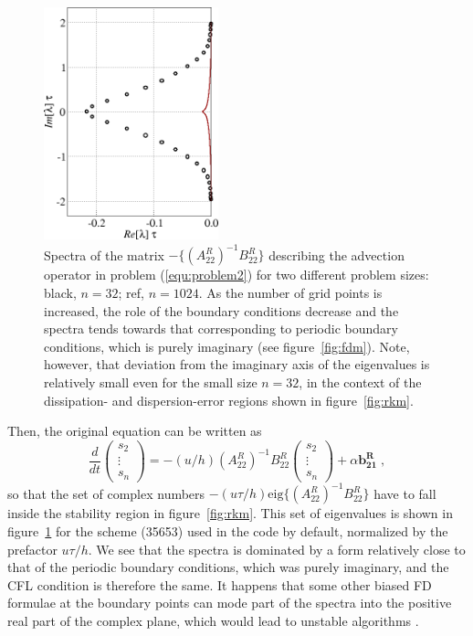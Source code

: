 {\begin{figure}
\includegraphics[clip,width=0.45\textwidth]{figs/AdvectionSpectra.png}
\caption{Spectra of the matrix $-\{(A^R_{22})^{-1}B^R_{22}\}$ describing the
  advection operator in problem (\ref{equ:problem2}) for two different problem
  sizes: black, $n=32$; ref, $n=1024$. As the number of grid points is
  increased, the role of the boundary conditions decrease and the spectra tends
  towards that corresponding to periodic boundary conditions, which is purely
  imaginary (see figure~\ref{fig:fdm}). Note, however, that deviation from the
  imaginary axis of the eigenvalues is relatively small even for the small size
  $n=32$, in the context of the dissipation- and dispersion-error regions shown
  in figure~\ref{fig:rkm}.}\label{fig:advection}
\end{figure}

Then, the original equation can be written as
\begin{equation}
\frac{d}{dt}
\left(\begin{array}{c}s_2\\\vdots\\s_n\end{array}\right) =
-(u/h)(A^R_{22})^{-1}B^R_{22}\left(\begin{array}{c}s_2\\\vdots\\s_n\end{array}\right)+
\alpha\mathbf{b^R_{21}} \;,
\end{equation}
so that the set of complex numbers $-(u\tau/h) \textrm{eig}
\{(A^R_{22})^{-1}B^R_{22}\}$ have to fall inside the stability region in
figure~\ref{fig:rkm}. This set of eigenvalues is shown in
figure~\ref{fig:advection} for the scheme (35653) used in the code by default,
normalized by the prefactor $u\tau/h$. We see that the spectra is dominated by a
form relatively close to that of the periodic boundary conditions, which was
purely imaginary, and the CFL condition is therefore the same. It happens that
some other biased FD formulae at the boundary points can mode part of the spectra
into the positive real part of the complex plane, which would lead to unstable
algorithms \citep{Carpenter:1993}.

}
